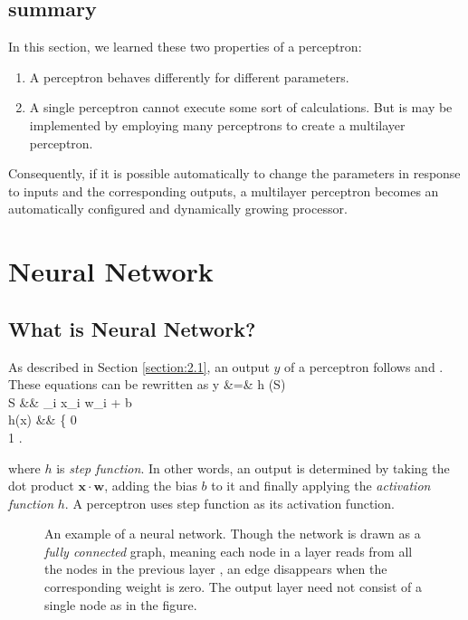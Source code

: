 \documentclass{article}
\theoremstyle{definition}
\newcommand{\sect}[1]{Section \ref{section:#1}}
\begin{document}
\subsection{summary}

In this section, we learned these two properties of a perceptron:
\begin{enumerate}
\item A perceptron behaves differently for different parameters.
\item A single perceptron cannot execute some sort of calculations. But is may be implemented by employing many perceptrons to create a multilayer perceptron.
\end{enumerate}

Consequently, if it is possible automatically to change the parameters in response to inputs and the corresponding outputs, a multilayer perceptron becomes an automatically configured and dynamically growing processor.


\enterr
\section{Neural Network}

\subsection{What is Neural Network?}

As described in \sect{2.1}, an output $y$ of a perceptron follows  and . These equations can be rewritten as
\begineq
y &=& h (S)  \\
S &\equiv& \sum _i x_i w_i + b  \\
h(x) &\equiv& \left\{  0  \\ 1  \edarray \right. 
\edeq

where $h$ is {\it step function}. In other words, an output is determined by taking the dot product $\bm{x} \cdot \bm{w}$, adding the bias $b$ to it and finally applying the {\it activation function} $h$. A perceptron uses step function as its activation function.\\

\begin{figure}[H]
    \centering
    \begin{subfigure}[H]{1.0\textwidth}
	\end{subfigure}
    \caption{An example of a neural network. Though the network is drawn as a {\it fully connected} graph, meaning each node in a layer reads from all the nodes in the previous layer \cite{6}, an edge disappears when the corresponding weight is zero. The output layer need not consist of a single node as in the figure.}
    \label{fig:3.1}
\end{figure}
\end{document}
